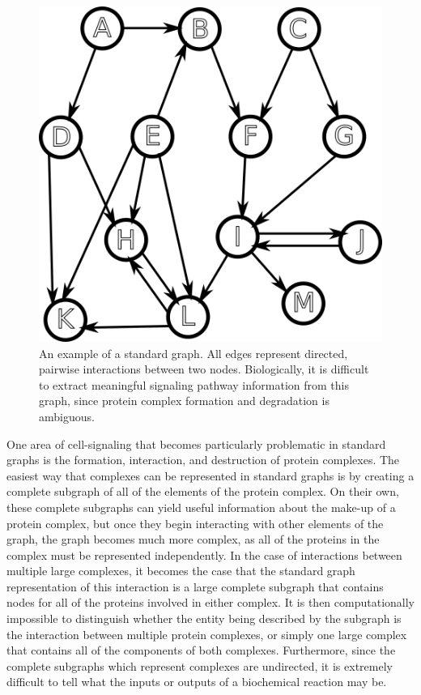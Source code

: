 \documentclass[12pt,twoside]{reedthesis}
\theoremstyle{definition}
\begin{document}
\begin{figure}[thbp]
  \begin{center}
    \includegraphics{example-standard-graph}
  \caption[A standard graph]{An example of a standard graph. All edges represent directed, pairwise interactions between two nodes. Biologically, it is difficult to extract meaningful signaling pathway information from this graph, since protein complex formation and degradation is ambiguous.}
  \label{fig:example-standard-graph}
  \end{center}
\end{figure}

One area of cell-signaling that becomes particularly problematic in standard graphs is the formation, interaction, and destruction of protein complexes.  The easiest way that complexes can be represented in standard graphs is by creating a complete subgraph of all of the elements of the protein complex.  On their own, these complete subgraphs can yield useful information about the make-up of a protein complex, but once they begin interacting with other elements of the graph, the graph becomes much more complex, as all of the proteins in the complex must be represented independently.  In the case of interactions between multiple large complexes, it becomes the case that the standard graph representation of this interaction is a large complete subgraph that contains nodes for all of the proteins involved in either complex.  It is then computationally impossible to distinguish whether the entity being described by the subgraph is the interaction between multiple protein complexes, or simply one large complex that contains all of the components of both complexes.  Furthermore, since the complete subgraphs which represent complexes are undirected, it is extremely difficult to tell what the inputs or outputs of a biochemical reaction may be.\par
\end{document}
